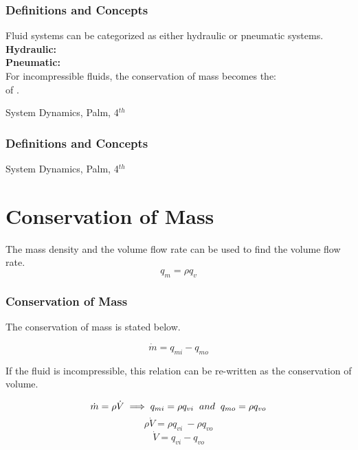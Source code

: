 \documentclass{beamer}                  %
\newcommand{\sectiontitleI}{Definitions and Concepts} %
\newcommand{\sectiontitleII}{Conservation of Mass}
\begin{document}
	\begin{frame}[label=sectionI] \small
		\frametitle{\sectiontitleI}
		Fluid systems can be categorized as either hydraulic or pneumatic systems. \vspace{5mm}\\

		{\bf Hydraulic:}\vspace{10mm}\\

		{\bf Pneumatic:}\vspace{10mm}\\ 

		
		For incompressible fluids, the conservation of mass becomes the: \vspace{2mm}\\
		\underline{\hspace{40mm}} of \underline{\hspace{40mm}}.

		\btVFill
		\tiny{System Dynamics, Palm, 4$^{th}$}	

	\end{frame}

	
	\begin{frame}[label=sectionI] \small
		\frametitle{\sectiontitleI}
		

		\btVFill
		\tiny{System Dynamics, Palm, 4$^{th}$}		
		
	\end{frame}

\section{\sectiontitleII}

	\begin{frame}[label=sectionII,containsverbatim] \small
		The mass density and the volume flow rate can be used to find the volume flow rate.
		\[ q_m=\rho q_v \]
		
	\end{frame}

	\begin{frame} \small
		\frametitle{\sectiontitleII}
			
		The conservation of mass is stated below.

		\[\dot{m}=q_{mi}-q_{mo}\]

		If the fluid is incompressible, this relation can be re-written as the conservation of volume.

		\[\dot{m}=\rho \dot{V} \implies q_{mi}=\rho q_{vi} \hspace{2mm} and \hspace{2mm} q_{mo}=\rho q_{vo}\]
		\[\rho\dot{V}=\rho q_{vi}\ -\rho q_{vo}\]
		\[\dot{V}=q_{vi}-q_{vo}\]

	\end{frame}	
\end{document}
